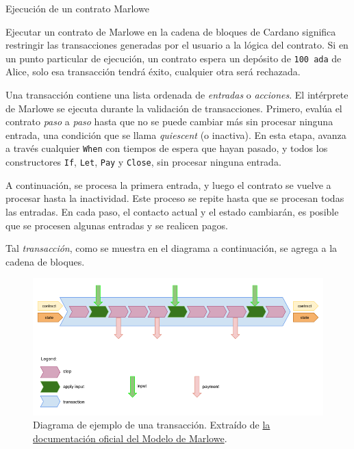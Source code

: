 \documentclass{beamer}
\begin{document}
\begin{frame}{Ejecución de un contrato Marlowe}

Ejecutar un contrato de Marlowe en la cadena de bloques de Cardano significa restringir las transacciones generadas por el usuario a la lógica del contrato. Si en un punto particular de ejecución, un contrato espera un depósito de \texttt{100 ada} de Alice, solo esa transacción tendrá éxito, cualquier otra será rechazada.

\bigskip
\pause

Una transacción contiene una lista ordenada de \textit{entradas} o \textit{acciones}. El intérprete de Marlowe se ejecuta durante la validación de transacciones. Primero, evalúa el contrato \textit{paso} a \textit{paso} hasta que no se puede cambiar más sin procesar ninguna entrada, una condición que se llama \textit{quiescent} (o inactiva). En esta etapa, avanza a través cualquier \texttt{When} con tiempos de espera que hayan pasado, y todos los constructores \texttt{If}, \texttt{Let}, \texttt{Pay} y \texttt{Close}, sin procesar ninguna entrada.

\end{frame}

\begin{frame}
A continuación, se procesa la primera entrada, y luego el contrato se vuelve a procesar hasta la inactividad. Este proceso se repite hasta que se procesan todas las entradas. En cada paso, el contacto actual y el estado cambiarán, es posible que se procesen algunas entradas y se realicen pagos.

\vfill

Tal \textit{transacción}, como se muestra en el diagrama a continuación, se agrega a la cadena de bloques. 

\end{frame}

\begin{frame}

\begin{figure}[H]
    \centering
    \includegraphics[width=\textwidth]{Transaccion.png}
    \caption[Diagrama de ejemplo de una transacción.]{Diagrama de ejemplo de una transacción. Extraído de \href{https://play.marlowe-finance.io/doc/marlowe/tutorials/marlowe-model.html}{la documentación oficial del Modelo de Marlowe}.}\label{fig:Transaccion}
\end{figure}

\end{frame}
\end{document}
